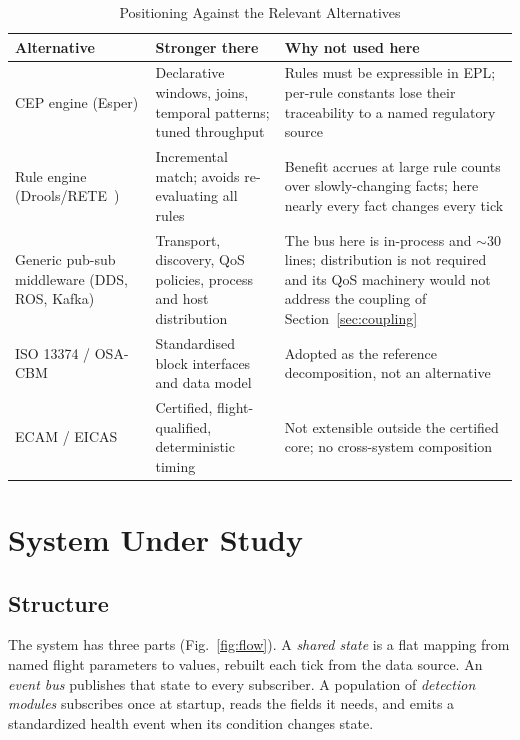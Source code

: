 \documentclass[conference]{IEEEtran}
\begin{document}
\begin{table}[t]
\caption{Positioning Against the Relevant Alternatives}
\label{tab:positioning}
\centering
\footnotesize
\begin{tabular}{@{}p{}p{}p{}@{}}
\toprule
\textbf{Alternative} & \textbf{Stronger there} & \textbf{Why not used here} \\
\midrule
CEP engine (Esper) &
Declarative windows, joins, temporal patterns; tuned throughput &
Rules must be expressible in EPL; per-rule constants lose their traceability
to a named regulatory source \\[2pt]
Rule engine (Drools/RETE~\cite{forgy1982}) &
Incremental match; avoids re-evaluating all rules &
Benefit accrues at large rule counts over slowly-changing facts; here nearly
every fact changes every tick \\[2pt]
Generic pub-sub middleware (DDS, ROS, Kafka) &
Transport, discovery, QoS policies, process and host distribution &
The bus here is in-process and $\sim$30 lines; distribution is not required
and its QoS machinery would not address the coupling of
Section~\ref{sec:coupling} \\[2pt]
ISO 13374 / OSA-CBM~\cite{iso13374} &
Standardised block interfaces and data model &
Adopted as the reference decomposition, not an alternative \\[2pt]
ECAM / EICAS &
Certified, flight-qualified, deterministic timing &
Not extensible outside the certified core; no cross-system composition \\
\bottomrule
\end{tabular}
\end{table}

\section{System Under Study}
\label{sec:system}

\subsection{Structure}

The system has three parts (Fig.~\ref{fig:flow}). A \emph{shared state} is a
flat mapping from named flight parameters to values, rebuilt each tick
from the data source. An
\emph{event bus} publishes that state to every subscriber. A population of
\emph{detection modules} subscribes once at startup, reads the fields it needs,
and emits a standardized health event when its condition changes state.
\end{document}

